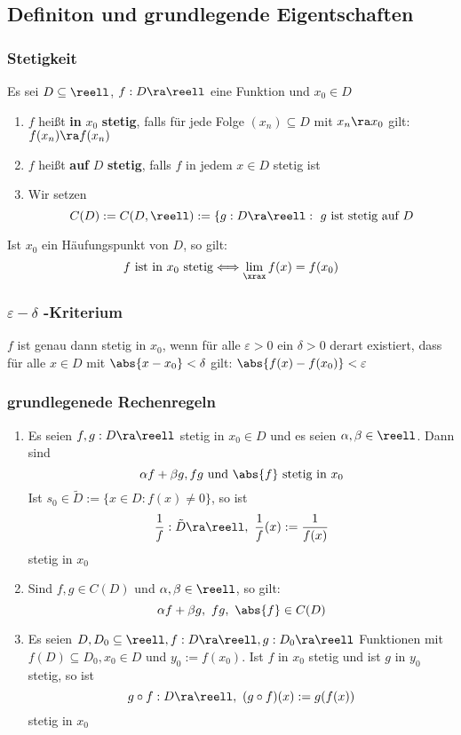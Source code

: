 \documentclass{kit}
\begin{document}
  \subsection{Definiton und grundlegende Eigentschaften}
    \subsubsection{Stetigkeit}
      Es sei $D\subseteq\reell$, $f:D\ra\reell$ eine Funktion und $x_0\in D$
      \begin{enumerate}
        \item $f$ heißt \textbf{in} $x_0$ \textbf{stetig}, falls für jede Folge $(x_n)\subseteq D$ mit $x_n\ra x_0$ gilt:\\
          $f(x_n)\ra f(x_n)$
        \item $f$ heißt \textbf{auf} $D$ \textbf{stetig}, falls $f$ in jedem $x\in D$ stetig ist
        \item Wir setzen
          $$C(D):=C(D,\reell):=\{g:D\ra\reell:\ g\text{ ist stetig auf }D$$
      \end{enumerate}
      Ist $x_0$ ein Häufungspunkt von $D$, so gilt:
      $$f\text{ ist in $x_0$ stetig}\Longleftrightarrow\lim_\xrax f(x)=f(x_0)$$
      \subsubsection{\texorpdfstring{$\varepsilon-\delta$}{} -Kriterium}
      $f$ ist genau dann stetig in $x_0$, wenn für alle $\varepsilon>0$ ein $\delta>0$ derart existiert, dass für alle $x\in D$ mit $\abs{x-x_0}<\delta$ gilt: $\abs{f(x)-f(x_0)}<\varepsilon$
    \subsubsection{grundlegenede Rechenregeln}
      \begin{enumerate}
        \item Es seien $f,g:D\ra\reell$ stetig in $x_0\in D$ und es seien $\alpha,\beta\in\reell$. Dann sind 
          $$\alpha f+\beta g,fg\text{ und }\abs{f}\text{ stetig in }x_0$$
          Ist $s_0\in\tilde D:=\{x\in D:f(x)\neq0\}$, so ist
          $$\frac{1}{f}:\tilde D\ra\reell,\ \frac{1}{f}(x):=\frac{1}{f(x)}$$
          stetig in $x_0$
        \item Sind $f,g\in C(D)$ und $\alpha,\beta\in\reell$, so gilt:
          $$\alpha f+\beta g,\ fg,\ \abs{f}\in C(D)$$
        \item Es seien $D,D_0\subseteq\reell,f:D\ra\reell,g:D_0\ra\reell$ Funktionen mit $f(D)\subseteq D_0,x_0\in D$ und $y_0:=f(x_0)$. Ist $f$ in $x_0$ stetig und ist $g$ in $y_0$ stetig, so ist
          $$g\circ f:D\ra\reell,\ (g\circ f)(x):=g(f(x))$$
          stetig in $x_0$
      \end{enumerate}
\end{document}
